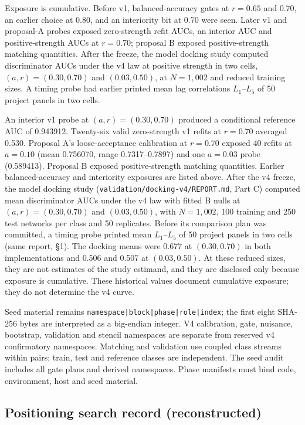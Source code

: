 Exposure is cumulative. %
Before v1, balanced-accuracy gates at $r=0.65$ and 0.70, an earlier choice at 0.80, and an interiority bit at 0.70 were seen. %
Later v1 and proposal-A probes exposed zero-strength refit AUCs, an interior AUC and positive-strength AUCs at $r=0.70$; proposal B exposed positive-strength matching quantities. %
After the freeze, the model docking study computed discriminator AUCs under the v4 law at positive strength in two cells, $(a,r)=(0.30,0.70)$ and $(0.03,0.50)$, at $N=1{,}002$ and reduced training sizes. A timing probe had earlier printed mean lag correlations $L_1$--$L_5$ of 50 project panels in two cells. %

An interior v1 probe at $(a,r)=(0.30,0.70)$ produced a conditional reference AUC of 0.943912. Twenty-six valid zero-strength v1 refits at $r=0.70$ averaged 0.530. Proposal A's loose-acceptance calibration at $r=0.70$ exposed 40 refits at $a=0.10$ (mean 0.756070, range 0.7317--0.7897) and one $a=0.03$ probe (0.589413). Proposal B exposed positive-strength matching quantities. Earlier balanced-accuracy and interiority exposures are listed above. After the v4 freeze, the model docking study (\texttt{validation/docking-v4/REPORT.md}, Part C) computed mean discriminator AUCs under the v4 law with fitted B nulls at $(a,r)=(0.30,0.70)$ and $(0.03,0.50)$, with $N=1{,}002$, 100 training and 250 test networks per class and 50 replicates. Before its comparison plan was committed, a timing probe printed mean $L_1$--$L_5$ of 50 project panels in two cells (same report, \S1). The docking means were 0.677 at $(0.30,0.70)$ in both implementations and 0.506 and 0.507 at $(0.03,0.50)$. At these reduced sizes, they are not estimates of the study estimand, and they are disclosed only because exposure is cumulative. These historical values document cumulative exposure; they do not determine the v4 curve. %

Seed material remains \texttt{namespace|block|phase|role|index}; the first eight SHA-256 bytes are interpreted as a big-endian integer. V4 calibration, gate, nuisance, bootstrap, validation and stencil namespaces are separate from reserved v4 confirmatory namespaces. Matching and validation use coupled class streams within pairs; train, test and reference classes are independent. The seed audit includes all gate plans and derived namespaces. Phase manifests must bind code, environment, host and seed material.

\subsection*{Positioning search record (reconstructed)}\label{supp:search-record}


